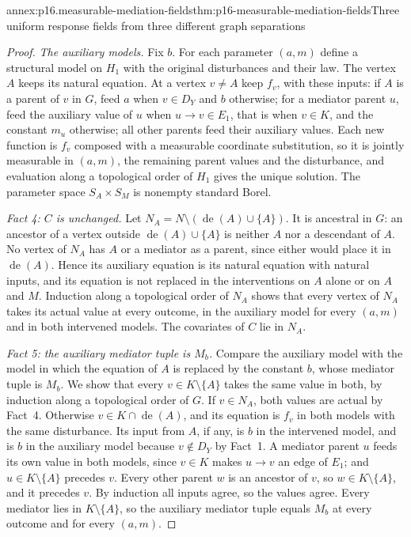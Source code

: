 \begin{annexitem}{annex:p16.measurable-mediation-fields}{thm:p16-measurable-mediation-fields}{Three uniform response fields from three different graph separations}
\begin{proof}
\emph{The auxiliary models.} Fix \(b\). For each parameter \((a,m)\)
define a structural model on \(H_1\) with the original disturbances and
their law. The vertex \(A\) keeps its natural equation. At a vertex
\(v\neq A\) keep \(f_v\), with these inputs: if \(A\) is a parent of
\(v\) in \(G\), feed \(a\) when \(v\in D_Y\) and \(b\) otherwise; for a
mediator parent \(u\), feed the auxiliary value of \(u\) when
\(u\to v\in E_1\), that is when \(v\in K\), and the constant \(m_u\)
otherwise; all other parents feed their auxiliary values. Each new
function is \(f_v\) composed with a measurable coordinate substitution,
so it is jointly measurable in \((a,m)\), the remaining parent values
and the disturbance, and evaluation along a topological order of
\(H_1\) gives the unique solution. The parameter space
\(S_A\times S_M\) is nonempty standard Borel.

\emph{Fact 4: \(C\) is unchanged.} Let
\(N_A=N\setminus(\operatorname{de}(A)\cup\{A\})\). It is ancestral in
\(G\): an ancestor of a vertex outside \(\operatorname{de}(A)\cup\{A\}\)
is neither \(A\) nor a descendant of \(A\). No vertex of \(N_A\) has
\(A\) or a mediator as a parent, since either would place it in
\(\operatorname{de}(A)\). Hence its auxiliary equation is its natural
equation with natural inputs, and its equation is not replaced in the
interventions on \(A\) alone or on \(A\) and \(M\). Induction along a
topological order of \(N_A\) shows that every vertex of \(N_A\) takes
its actual value at every outcome, in the auxiliary model for every
\((a,m)\) and in both intervened models. The covariates of \(C\) lie in
\(N_A\).

\emph{Fact 5: the auxiliary mediator tuple is \(M_b\).} Compare the
auxiliary model with the model in which the equation of \(A\) is
replaced by the constant \(b\), whose mediator tuple is \(M_b\). We show
that every \(v\in K\setminus\{A\}\) takes the same value in both, by
induction along a topological order of \(G\). If \(v\in N_A\), both
values are actual by Fact~4. Otherwise \(v\in K\cap\operatorname{de}(A)\),
and its equation is \(f_v\) in both models with the same disturbance.
Its input from \(A\), if any, is \(b\) in the intervened model, and is
\(b\) in the auxiliary model because \(v\notin D_Y\) by Fact~1. A
mediator parent \(u\) feeds its own value in both models, since
\(v\in K\) makes \(u\to v\) an edge of \(E_1\); and \(u\in
K\setminus\{A\}\) precedes \(v\). Every other parent \(w\) is an
ancestor of \(v\), so \(w\in K\setminus\{A\}\), and it precedes \(v\).
By induction all inputs agree, so the values agree. Every mediator lies
in \(K\setminus\{A\}\), so the auxiliary mediator tuple equals \(M_b\)
at every outcome and for every \((a,m)\).


\end{proof}
\end{annexitem}

